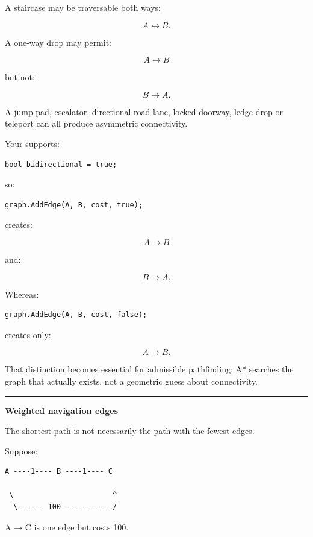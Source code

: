 A staircase may be traversable both ways:

\[
A\leftrightarrow B.
\]

A one-way drop may permit:

\[
A\rightarrow B
\]

but not:

\[
B\rightarrow A.
\]

A jump pad, escalator, directional road lane, locked doorway, ledge drop or teleport can all produce asymmetric connectivity.

Your  supports:

\begin{verbatim}
bool bidirectional = true;
\end{verbatim}

so:

\begin{verbatim}
graph.AddEdge(A, B, cost, true);
\end{verbatim}

creates:

\[
A\rightarrow B
\]

and:

\[
B\rightarrow A.
\]

Whereas:

\begin{verbatim}
graph.AddEdge(A, B, cost, false);
\end{verbatim}

creates only:

\[
A\rightarrow B.
\]

That distinction becomes essential for admissible pathfinding: A* searches the graph that actually exists, not a geometric guess about connectivity.

\begin{center}\rule{0.5\linewidth}{0.5pt}\end{center}

\textbf{Weighted navigation edges}

The shortest path is not necessarily the path with the fewest edges.

Suppose:

\begin{verbatim}
A ----1---- B ----1---- C

 \                       ^
  \------ 100 -----------/
\end{verbatim}

A → C is one edge but costs 100.

